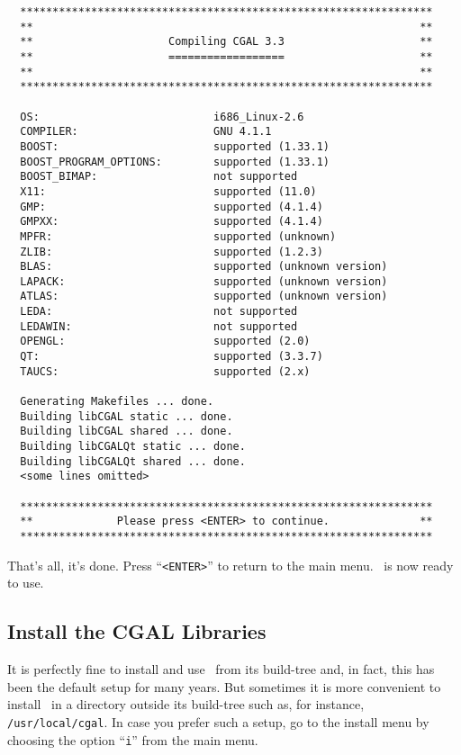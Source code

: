 {\ccTexHtml{\scriptsize}{}
\begin{verbatim}
  ****************************************************************
  **                                                            **
  **                     Compiling CGAL 3.3                     **
  **                     ==================                     **
  **                                                            **
  ****************************************************************

  OS:                           i686_Linux-2.6
  COMPILER:                     GNU 4.1.1
  BOOST:                        supported (1.33.1)
  BOOST_PROGRAM_OPTIONS:        supported (1.33.1)
  BOOST_BIMAP:                  not supported
  X11:                          supported (11.0)
  GMP:                          supported (4.1.4)
  GMPXX:                        supported (4.1.4)
  MPFR:                         supported (unknown)
  ZLIB:                         supported (1.2.3)
  BLAS:                         supported (unknown version)
  LAPACK:                       supported (unknown version)
  ATLAS:                        supported (unknown version)
  LEDA:                         not supported
  LEDAWIN:                      not supported
  OPENGL:                       supported (2.0)
  QT:                           supported (3.3.7)
  TAUCS:                        supported (2.x)

  Generating Makefiles ... done.
  Building libCGAL static ... done.
  Building libCGAL shared ... done.
  Building libCGALQt static ... done.
  Building libCGALQt shared ... done.
  <some lines omitted>

  ****************************************************************
  **             Please press <ENTER> to continue.              **
  ****************************************************************
\end{verbatim}}
{
}

That's all, it's done. Press ``\texttt{<ENTER>}'' to return to the
main menu. \cgal\ is now ready to use.

\subsection{Install the CGAL Libraries\label{sec:install-the-libs}}

It is perfectly fine to install and use \cgal\ from its build-tree
and, in fact, this has been the default setup for many years. But
sometimes it is more convenient to install \cgal\ in a directory
outside its build-tree such as, for instance,
\texttt{/usr/local/cgal}. In case you prefer such a setup, go to the
install menu by choosing the option ``\texttt{i}'' from the main menu.

